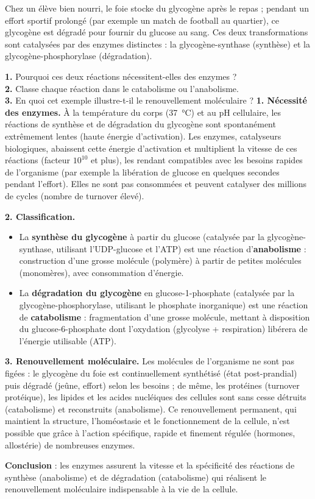 \documentclass[11pt]{article}
\begin{document}
\begin{exoresolu}
Chez un élève bien nourri, le foie stocke du glycogène après le repas ; pendant un effort sportif prolongé (par exemple un match de football au quartier), ce glycogène est dégradé pour fournir du glucose au sang. Ces deux transformations sont catalysées par des enzymes distinctes : la glycogène-synthase (synthèse) et la glycogène-phosphorylase (dégradation).

\textbf{1.} Pourquoi ces deux réactions nécessitent-elles des enzymes ?\\
\textbf{2.} Classe chaque réaction dans le catabolisme ou l'anabolisme.\\
\textbf{3.} En quoi cet exemple illustre-t-il le renouvellement moléculaire ?
\tcblower
\textbf{1. Nécessité des enzymes.} À la température du corps (\SI{37}{\celsius}) et au pH cellulaire, les réactions de synthèse et de dégradation du glycogène sont spontanément extrêmement lentes (haute énergie d'activation). Les enzymes, catalyseurs biologiques, abaissent cette énergie d'activation et multiplient la vitesse de ces réactions (facteur $10^{10}$ et plus), les rendant compatibles avec les besoins rapides de l'organisme (par exemple la libération de glucose en quelques secondes pendant l'effort). Elles ne sont pas consommées et peuvent catalyser des millions de cycles (nombre de turnover élevé).

\textbf{2. Classification.}
\begin{itemize}
\item La \textbf{synthèse du glycogène} à partir du glucose (catalysée par la glycogène-synthase, utilisant l'UDP-glucose et l'ATP) est une réaction d'\textbf{anabolisme} : construction d'une grosse molécule (polymère) à partir de petites molécules (monomères), avec consommation d'énergie.
\item La \textbf{dégradation du glycogène} en glucose-1-phosphate (catalysée par la glycogène-phosphorylase, utilisant le phosphate inorganique) est une réaction de \textbf{catabolisme} : fragmentation d'une grosse molécule, mettant à disposition du glucose-6-phosphate dont l'oxydation (glycolyse + respiration) libérera de l'énergie utilisable (ATP).
\end{itemize}

\textbf{3. Renouvellement moléculaire.} Les molécules de l'organisme ne sont pas figées : le glycogène du foie est continuellement synthétisé (état post-prandial) puis dégradé (jeûne, effort) selon les besoins ; de même, les protéines (turnover protéique), les lipides et les acides nucléiques des cellules sont sans cesse détruits (catabolisme) et reconstruits (anabolisme). Ce renouvellement permanent, qui maintient la structure, l'homéostasie et le fonctionnement de la cellule, n'est possible que grâce à l'action spécifique, rapide et finement régulée (hormones, allostérie) de nombreuses enzymes.

\textbf{Conclusion} : les enzymes assurent la vitesse et la spécificité des réactions de synthèse (anabolisme) et de dégradation (catabolisme) qui réalisent le renouvellement moléculaire indispensable à la vie de la cellule.
\end{exoresolu}
\end{document}
